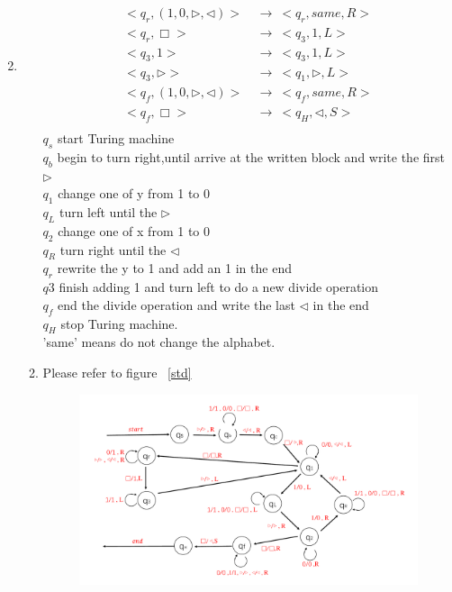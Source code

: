 \documentclass[12pt,a4paper]{article}
\makeatletter
\newtheorem*{solution}{Solution}
\theoremstyle{definition}
\renewenvironment{solution}[1][Solution] {\par\pushQED{\qed}\normalfont\topsep6\p@\@plus6\p@\relax\trivlist\item[\hskip\labelsep\bfseries#1\@addpunct{.}]\ignorespaces}{\popQED\endtrivlist\@endpefalse} \makeatother
\makeatother
\begin{document}
\begin{enumerate}
\begin{solution}
\begin{enumerate}
\begin{equation}
\begin{aligned}
            <q_r,(1,0,\triangleright,\triangleleft)> ~&\rightarrow~ <q_r,same,R>\\
            <q_r,\Box> ~&\rightarrow~ <q_3,1,L>\\
            <q_3,1>~&\rightarrow~ <q_3,1,L>\\
            <q_3,\triangleright>~&\rightarrow~ <q_1,\triangleright,L>\\
            <q_f,(1,0,\triangleright,\triangleleft)> ~&\rightarrow~ <q_f,same,R>\\
            <q_f,\Box> ~&\rightarrow~ <q_H,\triangleleft,S>\\
            \end{aligned}
        \end{equation}
        $q_s$ start Turing machine\\$q_b$ begin to turn right,until arrive at the written block and write the first $\triangleright$\\$q_1$ change one of y from 1 to 0\\$q_L$ turn left until the $\triangleright$\\$q_2$ change one of x from 1 to 0\\$q_R$ turn right until the $\triangleleft$\\$q_r$ rewrite the y to 1 and add an 1 in the end\\$q3$ finish adding 1 and turn left to do a new divide operation\\$q_f$ end the divide operation and write the last $\triangleleft$ in the end\\$q_H$ stop Turing machine.\\
        'same' means do not change the alphabet.
        \item
        Please refer to figure ~\ref{std}
        \begin{figure}[htbp]
        \centering
        \includegraphics[width=1\textwidth]{turing machine.pdf}

\end{figure}
\end{enumerate}
\end{solution}
\end{enumerate}
\end{document}
